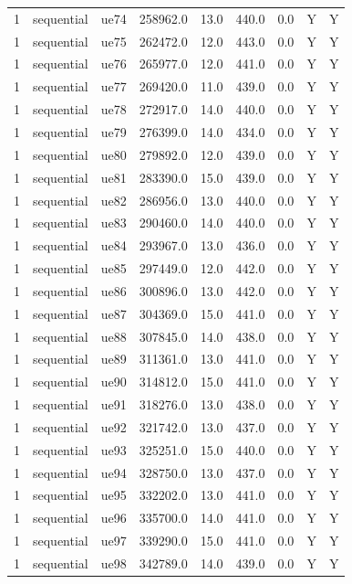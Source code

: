 \begin{table}[ht]
\begin{tabular}{|c|c|c|c|c|c|c|c|c|}
1 & sequential & ue74 & 258962.0 & 13.0 & 440.0 & 0.0 & Y & Y \\
1 & sequential & ue75 & 262472.0 & 12.0 & 443.0 & 0.0 & Y & Y \\
1 & sequential & ue76 & 265977.0 & 12.0 & 441.0 & 0.0 & Y & Y \\
1 & sequential & ue77 & 269420.0 & 11.0 & 439.0 & 0.0 & Y & Y \\
1 & sequential & ue78 & 272917.0 & 14.0 & 440.0 & 0.0 & Y & Y \\
1 & sequential & ue79 & 276399.0 & 14.0 & 434.0 & 0.0 & Y & Y \\
1 & sequential & ue80 & 279892.0 & 12.0 & 439.0 & 0.0 & Y & Y \\
1 & sequential & ue81 & 283390.0 & 15.0 & 439.0 & 0.0 & Y & Y \\
1 & sequential & ue82 & 286956.0 & 13.0 & 440.0 & 0.0 & Y & Y \\
1 & sequential & ue83 & 290460.0 & 14.0 & 440.0 & 0.0 & Y & Y \\
1 & sequential & ue84 & 293967.0 & 13.0 & 436.0 & 0.0 & Y & Y \\
1 & sequential & ue85 & 297449.0 & 12.0 & 442.0 & 0.0 & Y & Y \\
1 & sequential & ue86 & 300896.0 & 13.0 & 442.0 & 0.0 & Y & Y \\
1 & sequential & ue87 & 304369.0 & 15.0 & 441.0 & 0.0 & Y & Y \\
1 & sequential & ue88 & 307845.0 & 14.0 & 438.0 & 0.0 & Y & Y \\
1 & sequential & ue89 & 311361.0 & 13.0 & 441.0 & 0.0 & Y & Y \\
1 & sequential & ue90 & 314812.0 & 15.0 & 441.0 & 0.0 & Y & Y \\
1 & sequential & ue91 & 318276.0 & 13.0 & 438.0 & 0.0 & Y & Y \\
1 & sequential & ue92 & 321742.0 & 13.0 & 437.0 & 0.0 & Y & Y \\
1 & sequential & ue93 & 325251.0 & 15.0 & 440.0 & 0.0 & Y & Y \\
1 & sequential & ue94 & 328750.0 & 13.0 & 437.0 & 0.0 & Y & Y \\
1 & sequential & ue95 & 332202.0 & 13.0 & 441.0 & 0.0 & Y & Y \\
1 & sequential & ue96 & 335700.0 & 14.0 & 441.0 & 0.0 & Y & Y \\
1 & sequential & ue97 & 339290.0 & 15.0 & 441.0 & 0.0 & Y & Y \\
1 & sequential & ue98 & 342789.0 & 14.0 & 439.0 & 0.0 & Y & Y \\

\end{tabular}
\end{table}
